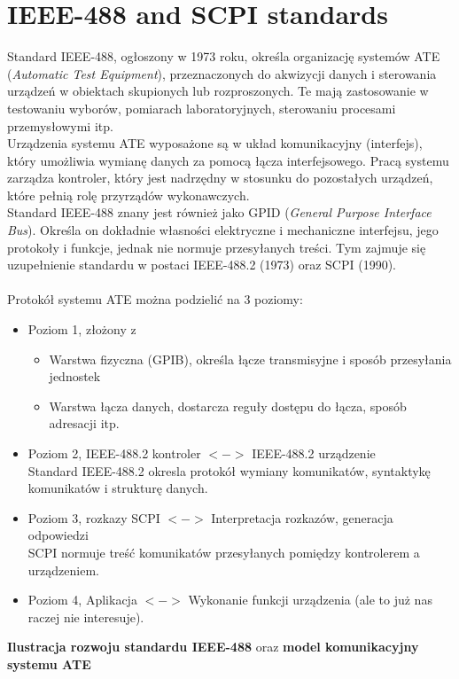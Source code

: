 \newcommand\XOR{\mathbin{\char`\^}}

\section{IEEE-488 and SCPI standards}
Standard IEEE-488, ogłoszony w 1973 roku, określa organizację systemów ATE (\emph{Automatic Test Equipment}), przeznaczonych do akwizycji danych i sterowania urządzeń w obiektach skupionych lub rozproszonych. Te mają zastosowanie w testowaniu wyborów, pomiarach laboratoryjnych, sterowaniu procesami przemysłowymi itp.\\
Urządzenia systemu ATE wyposażone są w układ komunikacyjny (interfejs), który umożliwia wymianę danych za pomocą łącza interfejsowego. Pracą systemu zarządza kontroler, który jest nadrzędny w stosunku do pozostałych urządzeń, które pełnią rolę przyrządów wykonawczych.\\
Standard IEEE-488 znany jest również jako GPID (\emph{General Purpose Interface Bus}). Określa on dokładnie własności elektryczne i mechaniczne interfejsu, jego protokoły i funkcje, jednak nie normuje przesyłanych treści. Tym zajmuje się uzupełnienie standardu w postaci IEEE-488.2 (1973) oraz SCPI (1990).\\\\
Protokół systemu ATE można podzielić na 3 poziomy:
\begin{itemize}
	\item Poziom 1, złożony z
	\begin{itemize}
		\item Warstwa fizyczna (GPIB), określa łącze transmisyjne i sposób przesyłania jednostek
		\item Warstwa łącza danych, dostarcza reguły dostępu do łącza, sposób adresacji itp.
	\end{itemize}
	\item Poziom 2, IEEE-488.2 kontroler $<->$ IEEE-488.2 urządzenie\\
	Standard IEEE-488.2 okresla protokół wymiany komunikatów, syntaktykę komunikatów i strukturę danych.
	\item Poziom 3, rozkazy SCPI $<->$ Interpretacja rozkazów, generacja odpowiedzi\\
	SCPI normuje treść komunikatów przesyłanych pomiędzy kontrolerem a urządzeniem.
	\item Poziom 4, Aplikacja $<->$ Wykonanie funkcji urządzenia (ale to już nas raczej nie interesuje).
\end{itemize}
\textbf{Ilustracja rozwoju standardu IEEE-488} oraz \textbf{model komunikacyjny systemu ATE}\\
